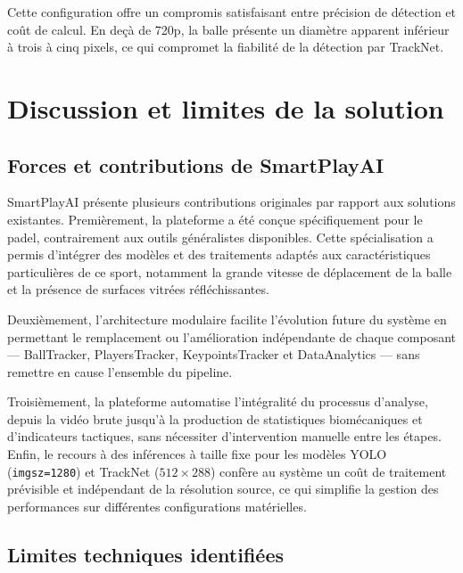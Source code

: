 Cette configuration offre un compromis satisfaisant entre précision de détection
et coût de calcul. En deçà de 720p, la balle présente un diamètre apparent
inférieur à trois à cinq pixels, ce qui compromet la fiabilité de la détection
par TrackNet.

\section{Discussion et limites de la solution}

\subsection{Forces et contributions de SmartPlayAI}

SmartPlayAI présente plusieurs contributions originales par rapport aux solutions
existantes. Premièrement, la plateforme a été conçue spécifiquement pour le
padel, contrairement aux outils généralistes disponibles. Cette spécialisation a
permis d'intégrer des modèles et des traitements adaptés aux caractéristiques
particulières de ce sport, notamment la grande vitesse de déplacement de la balle
et la présence de surfaces vitrées réfléchissantes.

Deuxièmement, l'architecture modulaire facilite l'évolution future du système en
permettant le remplacement ou l'amélioration indépendante de chaque composant
— BallTracker, PlayersTracker, KeypointsTracker et DataAnalytics — sans remettre
en cause l'ensemble du pipeline.

Troisièmement, la plateforme automatise l'intégralité du processus d'analyse,
depuis la vidéo brute jusqu'à la production de statistiques biomécaniques et
d'indicateurs tactiques, sans nécessiter d'intervention manuelle entre les étapes.
Enfin, le recours à des inférences à taille fixe pour les modèles YOLO
(\texttt{imgsz=1280}) et TrackNet ($512\times288$) confère au système un coût de
traitement prévisible et indépendant de la résolution source, ce qui simplifie la
gestion des performances sur différentes configurations matérielles.

\subsection{Limites techniques identifiées}


